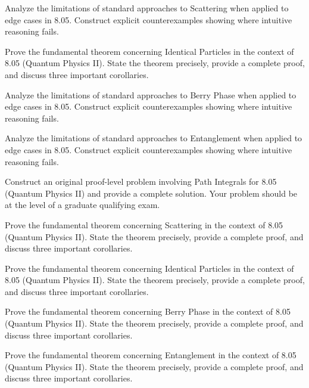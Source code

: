\documentclass[12pt,a4paper]{exam}
\begin{document}
\begin{questions}
\vspace{0.3cm}

\question[5]
Analyze the limitations of standard approaches to Scattering when applied to edge cases in 8.05. Construct explicit counterexamples showing where intuitive reasoning fails.

\vspace{0.3cm}

\question[4]
Prove the fundamental theorem concerning Identical Particles in the context of 8.05 (Quantum Physics II). State the theorem precisely, provide a complete proof, and discuss three important corollaries.

\vspace{0.3cm}

\question[4]
Analyze the limitations of standard approaches to Berry Phase when applied to edge cases in 8.05. Construct explicit counterexamples showing where intuitive reasoning fails.

\vspace{0.3cm}

\question[5]
Analyze the limitations of standard approaches to Entanglement when applied to edge cases in 8.05. Construct explicit counterexamples showing where intuitive reasoning fails.

\vspace{0.3cm}

\question[7]
Construct an original proof-level problem involving Path Integrals for 8.05 (Quantum Physics II) and provide a complete solution. Your problem should be at the level of a graduate qualifying exam.

\vspace{0.3cm}

\question[3]
Prove the fundamental theorem concerning Scattering in the context of 8.05 (Quantum Physics II). State the theorem precisely, provide a complete proof, and discuss three important corollaries.

\vspace{0.3cm}

\question[2]
Prove the fundamental theorem concerning Identical Particles in the context of 8.05 (Quantum Physics II). State the theorem precisely, provide a complete proof, and discuss three important corollaries.

\vspace{0.3cm}

\question[5]
Prove the fundamental theorem concerning Berry Phase in the context of 8.05 (Quantum Physics II). State the theorem precisely, provide a complete proof, and discuss three important corollaries.

\vspace{0.3cm}

\question[3]
Prove the fundamental theorem concerning Entanglement in the context of 8.05 (Quantum Physics II). State the theorem precisely, provide a complete proof, and discuss three important corollaries.

\vspace{0.3cm}

\end{questions}
\end{document}
